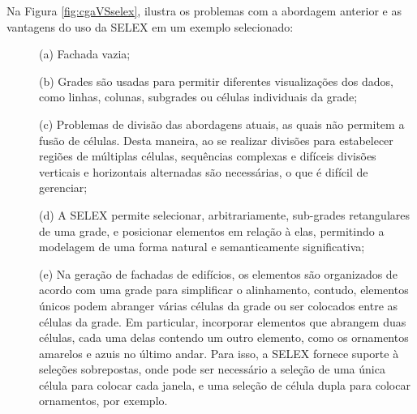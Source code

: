  Na Figura \ref{fig:cgaVSselex},  ilustra os problemas com a abordagem anterior e as vantagens do uso da \gls{SELEX} em um exemplo selecionado: 
 
 \begin{description}
     \item[] \; (a) Fachada vazia;
     
     \item[] \; (b) Grades são usadas para permitir diferentes visualizações dos dados, como linhas, colunas, subgrades ou células individuais da grade;
     
     \item[] \; (c) Problemas de divisão das abordagens atuais, as quais não permitem a fusão de células. Desta maneira, ao se realizar divisões para estabelecer regiões de múltiplas células, sequências complexas e difíceis divisões verticais e horizontais alternadas são necessárias, o que é difícil de gerenciar;
     
     \item[] \; (d) A \gls{SELEX} permite selecionar, arbitrariamente, sub-grades retangulares de uma grade, e posicionar elementos em relação à elas, permitindo a modelagem de uma forma natural e semanticamente significativa;
     
     \item[] \; (e) Na geração de fachadas de edifícios, os elementos são organizados de acordo com uma grade para simplificar o alinhamento, contudo, elementos únicos podem abranger várias células da grade ou ser colocados entre as células da grade. Em particular, incorporar elementos que abrangem duas células, cada uma delas contendo um outro elemento, como os ornamentos amarelos e azuis no último andar. Para isso, a \gls{SELEX} fornece suporte à seleções sobrepostas, onde pode ser necessário a seleção de uma única célula para colocar cada janela, e uma seleção de célula dupla para colocar ornamentos, por exemplo.
 \end{description}
 

\begin{figure}[h!]
	\centering
	\captionsetup{width=15cm}
	{}	
\end{figure}

